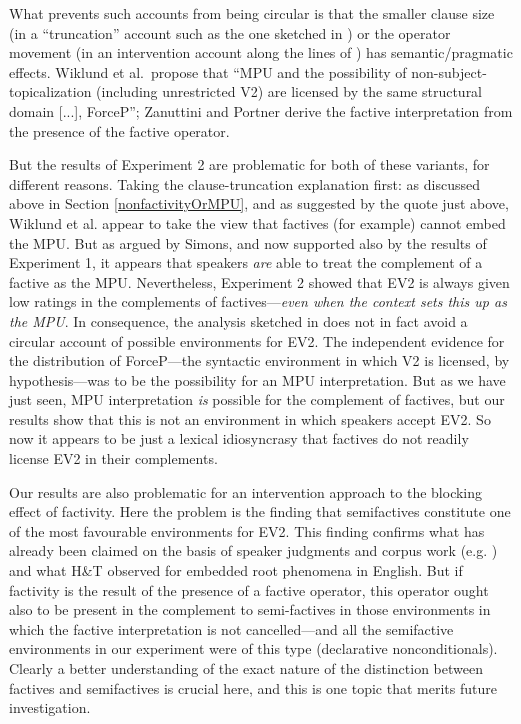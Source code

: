 \documentclass[output=paper]{LSP/langsci}
\begin{document}
What prevents such accounts from being circular is that the smaller clause size (in a ``truncation'' account such as the one sketched in \citealt{wiklund-etal09}) or the operator movement (in an intervention account along the lines of \citealt{zanuttini-portner03,haegeman10conditionals,haegeman12syntax}) has semantic/pragmatic effects.  Wiklund et al.\  propose that ``MPU and the possibility of non-subject-topicalization (including unrestricted V2) are licensed by the same structural domain [...], ForceP''; Zanuttini and Portner derive the factive interpretation from the presence of the factive operator.  

But the results of Experiment 2 are problematic for both of these variants, for different reasons. Taking the clause-truncation explanation first: as discussed above in Section \ref{nonfactivityOrMPU}, and as suggested by the quote just above, Wiklund et al. appear to take the view that factives (for example) cannot embed the MPU. But as argued by Simons, and now supported also by the results of Experiment 1, it appears that speakers \textit{are} able to treat the complement of a factive as the MPU.  Nevertheless, Experiment 2 showed that EV2 is always given low ratings in the complements of factives---\textit{even when the context sets this up as the MPU}.  In consequence, the analysis sketched in \cite{wiklund-etal09} does not in fact avoid a circular account of possible environments for EV2. The independent evidence for the distribution of ForceP---the syntactic environment in which V2 is licensed, by hypothesis---was to be the possibility for an MPU interpretation. But as we have just seen, MPU interpretation \textit{is} possible for the complement of factives, but our results show that this is not an environment in which speakers accept EV2.  So now it appears to be just a lexical idiosyncrasy that factives do not readily license EV2 in their complements.

Our results are also problematic for an intervention approach to the blocking effect of factivity. Here the problem is the finding that semifactives constitute one of the most favourable environments for EV2. This finding confirms what has already been claimed on the basis of speaker judgments and corpus work (e.g. \citealt{F-etal09,jensen-christensen13,julien15}) and what H\&T observed for embedded root phenomena in English. But if factivity is the result of the presence of a factive operator,  this operator ought also to be present in the complement to semi-factives in those environments in which the factive interpretation is not cancelled---and all the semifactive environments in our experiment were of this type (declarative nonconditionals).  Clearly a better understanding of the exact nature of the distinction between factives and semifactives is crucial here, and this is one topic that merits future investigation.
\end{document}
